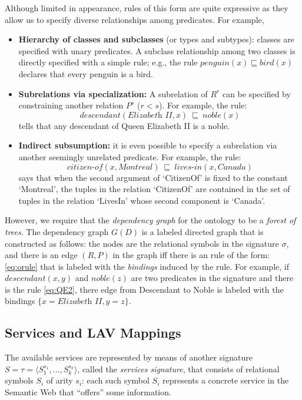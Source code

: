 \documentclass{llncs}
\newcommand{\tup}[1]{\langle #1 \rangle}
\newcommand{\orule}{\sqsubseteq}
\begin{document}
Although limited in appearance, rules of this form are quite expressive
as they allow us to specify diverse relationships among predicates.
For example,
\begin{itemize}
\item \textbf{Hierarchy of classes and subclasses} (or types and subtypes):
classes are specified with unary predicates. A subclass relationship
among two classes is directly specified with a simple rule; e.g., the
rule $\textit{penguin}(x) \orule \textit{bird}(x)$ declares that every
penguin is a bird.
\item \textbf{Subrelations via specialization:} A subrelation of $R^r$
can be specified by constraining another relation $P^s$ ($r<s$). 
For example, the rule:
\begin{equation}
\label{eq:QE2}
\textit{descendant}(\textit{Elizabeth II},x)\ \orule\ \textit{noble}(x)
\end{equation}
tells that any descendant of Queen Elizabeth II is a noble.
\item \textbf{Indirect subsumption:} it is even possible to specify
a subrelation via another seemingly unrelated predicate. For example,
the rule:
\[ \textit{citizen-of}(x,\textit{Montreal})\ \orule\ \textit{lives-in}(x,\textit{Canada}) \]
says that when the second argument of `CitizenOf' is fixed to the
constant `Montreal', the tuples in the relation `CitizenOf' are
contained in the set of tuples in the relation `LivesIn' whose
second component is `Canada'.
\end{itemize}
However, we require that the \emph{dependency graph} for the ontology
to be a \emph{forest of trees}. The dependency graph $G(D)$ is a
labeled directed graph that is constructed as follows: the nodes
are the relational symbols in the signature $\sigma$, and there
is an edge $(R,P)$ in the graph iff there is an rule of the
form: \eqref{eq:orule} that is labeled with the \emph{bindings}
induced by the rule. For example, if $\textit{descendant}(x,y)$
and $\textit{noble}(z)$ are two predicates in the signature
and there is the rule \eqref{eq:QE2}, there edge from 
Descendant to Noble is labeled with the bindings
$\{x=\textit{Elizabeth II},y=z\}$.

\subsection{Services and LAV Mappings}

The available services are represented by means of another signature
$S=\tau=\tup{S_1^{s_1},\ldots,S_k^{s_k}}$, called the \emph{services signature},
that consists of relational symbols $S_i$ of arity $s_i$: each such symbol
$S_i$ represents a concrete service in the Semantic Web that ``offers''
some information.
\end{document}
